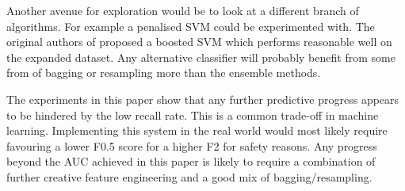 \documentclass[journal]{IEEEtran}
\begin{document}
Another avenue for exploration would be to look at a different branch of algorithms. For example a penalised SVM could be experimented with. The original authors of \cite{zikeba2014boosted} proposed a boosted SVM which performs reasonable well on the expanded dataset. Any alternative classifier will probably benefit from some from of bagging or resampling more than the ensemble methods.

The experiments in this paper show that any further predictive progress appears to be hindered by the low recall rate. This is a common trade-off in machine learning. Implementing this system in the real world would most likely require favouring a lower F0.5 score for a higher F2 for safety reasons. Any progress beyond the AUC achieved in this paper is likely to require a combination of further creative feature engineering and a good mix of bagging/resampling.





%
%

\end{document}
